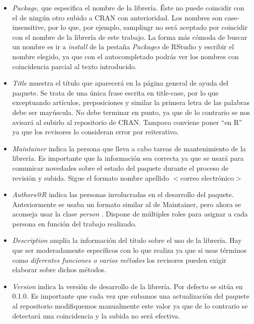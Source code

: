 \begin{itemize}[label=$\bullet$]
    \item \textit{Package}, que especifica el nombre de la librería. Éste no puede coincidir con el de ningún otro subido a CRAN con anterioridad. Los nombres son case-insensitive, por lo que, por ejemplo, samplingr no será aceptado por coincidir con el nombre de la librería de este trabajo. La forma más cómoda de buscar un nombre es ir a \textit{install} de la pestaña \textit{Packages} de RStudio  y escribir el nombre elegido, ya que con el autocompletado podrás ver los nombres con coincidencia parcial al texto introducido.
    \item \textit{Title} muestra el título que aparecerá en la página general de ayuda del paquete. Se trata de una única frase escrita en title-case, por lo que exceptuando artículos, preposiciones y similar la primera letra de las palabras debe ser mayúscula. No debe terminar en punto, ya que de lo contrario se nos avisará al subirlo al repositorio de CRAN. Tampoco conviene poner ``en R'' ya que los revisores lo consideran error por reiterativo. 
    \item \textit{Maintainer} indica la persona que lleva a cabo tareas de mantenimiento de la librería. Es importante que la información sea correcta ya que se usará para comunicar novedades sobre el estado del paquete durante el proceso de revisión y subida. Sigue el formato nombre apellido $<$correo electrónico$>$ 
    \item \textit{Authors@R} indica las personas involucradas en el desarrollo del paquete. Anteriormente se usaba un formato similar al de Maintainer, pero ahora se aconseja usar la clase \textit{person} \cite{person}. Dispone de múltiples roles para asignar a cada persona en función del trabajo realizado. 
    \item \textit{Description} amplía la información del título sobre el uso de la librería. Hay que ser moderadamente específicos con lo que realiza ya que si usas términos como \textit{diferentes funciones o varios métodos} los revisores pueden exigir elaborar sobre dichos métodos.
    \item \textit{Version} indica la versión de desarrollo de la librería. Por defecto se sitúa en 0.1.0. Es importante que cada vez que subamos una actualización del paquete al repositorio modifiquemos manualmente este valor ya que de lo contrario se detectará una coincidencia y la subida no será efectiva.
\end{itemize}

